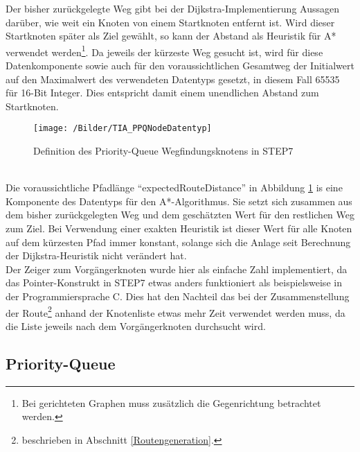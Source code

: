 			Der bisher zurückgelegte Weg gibt bei der Dijkstra-Implementierung Aussagen darüber, wie weit ein Knoten von einem Startknoten entfernt ist. Wird dieser Startknoten später als Ziel gewählt, so kann der Abstand als Heuristik für A* verwendet werden\footnote{Bei gerichteten Graphen muss zusätzlich die Gegenrichtung betrachtet werden.}. Da jeweils der kürzeste Weg gesucht ist, wird für diese Datenkomponente sowie auch für den voraussichtlichen Gesamtweg der Initialwert auf den Maximalwert des verwendeten Datentyps gesetzt, in diesem Fall 65535 für 16-Bit Integer. Dies entspricht damit einem unendlichen Abstand zum Startknoten.
			\\
			\begin{figure}[h]
				\centering
				\texttt{[image: /Bilder/TIA\_PPQNodeDatentyp]}
				\vspace{0.2cm}
				\caption{Definition des Priority-Queue Wegfindungsknotens in \ac{STEP7}}\label{PPQNode}
			\end{figure}
			\\
			Die voraussichtliche Pfadlänge "`expectedRouteDistance"' in Abbildung \ref{PPQNode} is eine Komponente des Datentyps für den A*-Algorithmus. Sie setzt sich zusammen aus dem bisher zurückgelegten Weg und dem geschätzten Wert für den restlichen Weg zum Ziel. Bei Verwendung einer exakten Heuristik ist dieser Wert für alle Knoten auf dem kürzesten Pfad immer konstant, solange sich die Anlage seit Berechnung der Dijkstra-Heuristik nicht verändert hat.
			\\[4pt]
			Der Zeiger zum Vorgängerknoten wurde hier als einfache Zahl implementiert, da das Pointer-Konstrukt in \ac{STEP7} etwas anders funktioniert als beispielsweise in der Programmiersprache C. Dies hat den Nachteil das bei der Zusammenstellung der Route\footnote{beschrieben in Abschnitt \ref{Routengeneration}.} anhand der Knotenliste etwas mehr Zeit verwendet werden muss, da die Liste jeweils nach dem Vorgängerknoten durchsucht wird.
		
		\subsection{Priority-Queue}
		
